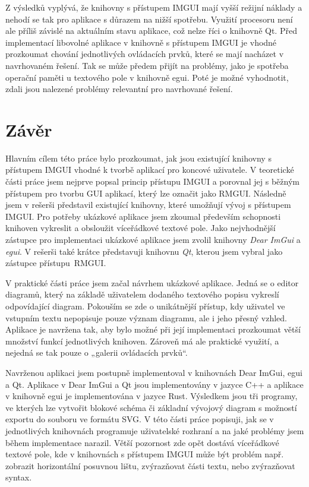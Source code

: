 \documentclass[FM,DP]{tulthesis}
\begin{document}
	Z výsledků vyplývá, že knihovny s přístupem IMGUI mají vyšší režijní náklady a nehodí se tak pro aplikace s důrazem na nižší spotřebu. Využití procesoru není ale příliš závislé na aktuálním stavu aplikace, což nelze říci o knihovně Qt. Před implementací libovolné aplikace v knihovně s přístupem IMGUI je vhodné prozkoumat chování jednotlivých ovládacích prvků, které se mají nacházet v navrhovaném řešení. Tak se může předem přijít na problémy, jako je spotřeba operační paměti u textového pole v knihovně egui. Poté je možné vyhodnotit, zdali jsou nalezené problémy relevantní pro navrhované řešení.
	
	\chapter{Závěr}	
	
	Hlavním cílem této práce bylo prozkoumat, jak jsou existující knihovny s přístupem IMGUI vhodné k tvorbě aplikací pro koncové uživatele. V teoretické části práce jsem nejprve popsal princip přístupu IMGUI a porovnal jej s běžným přístupem pro tvorbu GUI aplikací, který lze označit jako RMGUI. Následně jsem v rešerši představil existující knihovny, které umožňují vývoj s přístupem IMGUI. Pro potřeby ukázkové aplikace jsem zkoumal především schopnosti knihoven vykreslit a obsloužit víceřádkové textové pole. Jako nejvhodnější zástupce pro implementaci ukázkové aplikace jsem zvolil knihovny \textit{Dear ImGui} a \textit{egui}. V rešerši také krátce představuji knihovnu \textit{Qt}, kterou jsem vybral jako zástupce přístupu~RMGUI.
	
	V praktické části práce jsem začal návrhem ukázkové aplikace. Jedná se o editor diagramů, který na základě uživatelem dodaného textového popisu vykreslí odpovídající diagram. Pokouším se zde o unikátnější přístup, kdy uživatel ve vstupním textu nepopisuje pouze význam diagramu, ale i jeho přesný vzhled. Aplikace je navržena tak, aby bylo možné při její implementaci prozkoumat větší množství funkcí jednotlivých knihoven. Zároveň má ale praktické využití, a nejedná se tak pouze o „galerii ovládacích prvků“.
	
	
	Navrženou aplikaci jsem postupně implementoval v knihovnách Dear ImGui, egui a Qt. Aplikace v Dear ImGui a Qt jsou implementovány v jazyce C++ a aplikace v knihovně egui je implementována v jazyce Rust. Výsledkem jsou tři programy, ve kterých lze vytvořit blokové schéma či základní vývojový diagram s možností exportu do souboru ve formátu SVG. V této části práce popisuji, jak se v jednotlivých knihovnách programuje uživatelské rozhraní a na jaké problémy jsem během implementace narazil. Větší pozornost zde opět dostává víceřádkové textové pole, kde v knihovnách s přístupem IMGUI může být problém např. zobrazit horizontální posuvnou lištu, zvýrazňovat části textu, nebo zvýrazňovat syntax.
	
\end{document}
